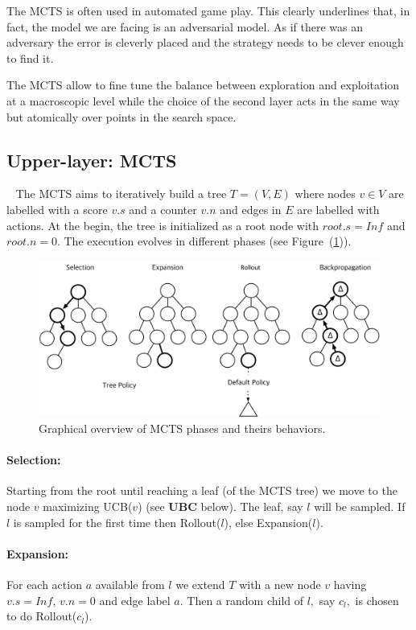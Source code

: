 \documentclass[11pt]{article}
\begin{document}
The MCTS is often used in automated game play. This clearly underlines that, in fact, the model we are facing is an adversarial model. As if there was an adversary the error is cleverly placed and the strategy needs to be clever enough to find it. 

The MCTS allow to fine tune the balance between exploration and exploitation at a macroscopic level while the choice of the second layer acts in the same way but atomically over points in the search space.

\subsection{Upper-layer: MCTS}~\label{sec:MCTS}
The MCTS aims to iteratively build a tree $T=(V,E)$ where nodes  $v \in V$ are labelled with a score $v.s$ and a counter $v.n$ and edges in $E$ are labelled with actions. At the begin, the tree is initialized as a root node with $root.s=Inf$ and $root.n=0$.
The execution evolves in different phases (see Figure~(\ref{fig:mcts})).

\begin{figure}[H]
  \includegraphics[width=\linewidth]{img/mcts2.png}
  \caption{Graphical overview of MCTS phases and theirs behaviors.}
  \label{fig:mcts}
\end{figure}

\paragraph{Selection:} Starting from the root until reaching a leaf (of the MCTS tree) we move to the node $v$ maximizing UCB($v$) (see \textbf{UBC} below). 
The leaf, say $l$ will be sampled. If $l$ is sampled for the first time then Rollout($l$), else Expansion($l$).

\paragraph{Expansion:} For each action $a$ available from $l$ we extend $T$ with a new node $v $ having $v.s=Inf$, $v.n=0$ and edge label $a$. Then a random child of $l,$ say $c_l,$ is chosen to do Rollout($c_l$).
\end{document}
